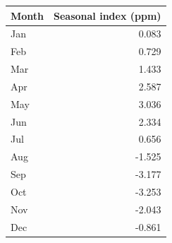 
\begin{tabular}[t]{lr}
\toprule
Month & Seasonal index (ppm)\\
\midrule
Jan & 0.083\\
Feb & 0.729\\
Mar & 1.433\\
Apr & 2.587\\
May & 3.036\\
Jun & 2.334\\
Jul & 0.656\\
Aug & -1.525\\
Sep & -3.177\\
Oct & -3.253\\
Nov & -2.043\\
Dec & -0.861\\
\bottomrule
\end{tabular}

